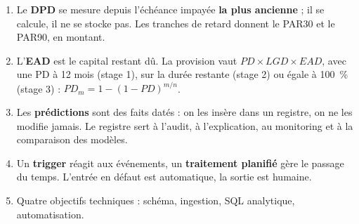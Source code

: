 \begin{resume}
\begin{enumerate}
\item Le \textbf{DPD} se mesure depuis l'échéance impayée \textbf{la plus ancienne} ; il se calcule, il
ne se stocke pas. Les tranches de retard donnent le PAR30 et le PAR90, en montant.
\item L'\textbf{EAD} est le capital restant dû. La provision vaut $PD \times LGD \times EAD$, avec une PD à
12 mois (stage 1), sur la durée restante (stage 2) ou égale à 100~\% (stage 3) : $PD_m = 1-(1-PD)^{m/n}$.
\item Les \textbf{prédictions} sont des faits datés : on les insère dans un registre, on ne les modifie
jamais. Le registre sert à l'audit, à l'explication, au monitoring et à la comparaison des modèles.
\item Un \textbf{trigger} réagit aux événements, un \textbf{traitement planifié} gère le passage du
temps. L'entrée en défaut est automatique, la sortie est humaine.
\item Quatre objectifs techniques : schéma, ingestion, SQL analytique, automatisation.
\end{enumerate}
\end{resume}
